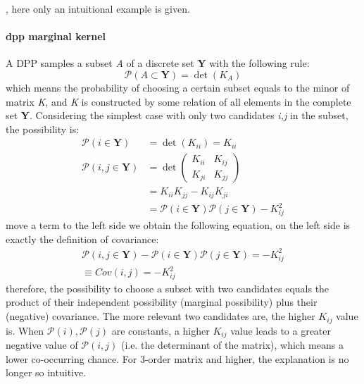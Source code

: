 , here only an intuitional example is given.
\paragraph{dpp marginal kernel}
A DPP samples a subset \emph{A} of a discrete set \textbf{Y} with the following rule:
\begin{equation}\label{er:dpp}
  \mathcal{P}(A\subset\textbf{Y})=\det(K_A)
\end{equation}
which means the probability of choosing a certain subset equals to the minor of matrix \emph{K}, and \emph{K} is constructed by some relation of all elements in the complete set \textbf{Y}. Considering the simplest case with only two candidates \emph{i,j} in the subset, the possibility is:
\begin{equation}\label{eq:dpp1}
\begin{split}
  \mathcal{P}(i\in\textbf{Y})&=\det(K_{ii})=K_{ii}
\\
  \mathcal{P}(i,j\in\textbf{Y})&=\det\begin{pmatrix}
                                       K_{ii} & K_{ij} \\
                                       K_{ji} & K_{jj}
                                     \end{pmatrix}
                                      \\&=K_{ii}K_{jj}-K_{ij}K_{ji}
                                      \\&=\mathcal{P}(i\in\textbf{Y})\mathcal{P}(j\in\textbf{Y})-K_{ij}^2
\end{split}
\end{equation}
move a term to the left side we obtain the following equation, on the left side is exactly the definition of covariance:
\begin{equation}\label{eq:dpp2}
\begin{split}
  \mathcal{P}(i,j\in\textbf{Y})-\mathcal{P}(i\in\textbf{Y})\mathcal{P}(j\in\textbf{Y})=-K_{ij}^2
  \\\equiv Cov(i,j)=-K_{ij}^2
  \end{split}
\end{equation}
therefore, the possibility to choose a subset with two candidates equals the product of their independent possibility (marginal possibility) plus their (negative) covariance. The more relevant two candidates are, the higher $K_{ij}$ value is. When $\mathcal{P}(i),\mathcal{P}(j)$ are constants, a higher $K_{ij}$ value leads to a greater negative value of $\mathcal{P}(i,j)$ (i.e. the determinant of the matrix), which means a lower co-occurring chance. For 3-order matrix and higher, the explanation is no longer so intuitive. 